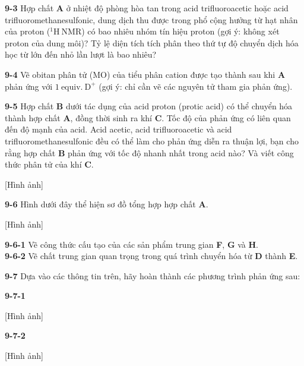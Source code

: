\vspace{0.2cm}

\noindent
\textbf{9-3} Hợp chất \textbf{A} ở nhiệt độ phòng hòa tan trong acid trifluoroacetic hoặc acid trifluoromethanesulfonic, dung dịch thu được trong phổ cộng hưởng từ hạt nhân của proton ($\mathrm{^1H\ NMR}$) có bao nhiêu nhóm tín hiệu proton (gợi ý: không xét proton của dung môi)? Tỷ lệ diện tích tích phân theo thứ tự độ chuyển dịch hóa học từ lớn đến nhỏ lần lượt là bao nhiêu?

\vspace{0.2cm}

\noindent
\textbf{9-4} Vẽ obitan phân tử (MO) của tiểu phân cation được tạo thành sau khi \textbf{A} phản ứng với $1\ \text{equiv.}\ \mathrm{D^+}$ (gợi ý: chỉ cần vẽ các nguyên tử tham gia phản ứng).

\vspace{0.2cm}

\noindent
\textbf{9-5} Hợp chất \textbf{B} dưới tác dụng của acid proton (protic acid) có thể chuyển hóa thành hợp chất \textbf{A}, đồng thời sinh ra khí \textbf{C}. Tốc độ của phản ứng có liên quan đến độ mạnh của acid. Acid acetic, acid trifluoroacetic và acid trifluoromethanesulfonic đều có thể làm cho phản ứng diễn ra thuận lợi, bạn cho rằng hợp chất \textbf{B} phản ứng với tốc độ nhanh nhất trong acid nào? Và viết công thức phân tử của khí \textbf{C}.
\begin{center}
    [Hình ảnh]
\end{center}

\noindent
\textbf{9-6} Hình dưới đây thể hiện sơ đồ tổng hợp hợp chất \textbf{A}.

\begin{center}
    [Hình ảnh]
\end{center}

\noindent
\textbf{9-6-1} Vẽ công thức cấu tạo của các sản phẩm trung gian \textbf{F}, \textbf{G} và \textbf{H}. \\
\textbf{9-6-2} Vẽ chất trung gian quan trọng trong quá trình chuyển hóa từ \textbf{D} thành \textbf{E}.

\vspace{0.2cm}

\noindent
\textbf{9-7} Dựa vào các thông tin trên, hãy hoàn thành các phương trình phản ứng sau:

\noindent
\textbf{9-7-1}
\begin{center}
    [Hình ảnh]
\end{center}

\noindent
\textbf{9-7-2}
\begin{center}
    [Hình ảnh]
\end{center}


